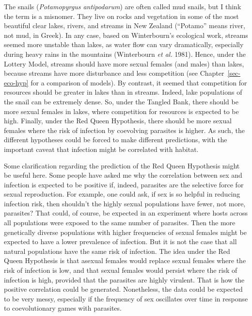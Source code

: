 \documentclass[
  letterpaper,
]{book}
\begin{document}
The snails (\emph{Potamopyrgus antipodarum}) are often called mud
snails, but I think the term is a misnomer. They live on rocks and
vegetation in some of the most beautiful clear lakes, rivers, and
streams in New Zealand (``Potamo'' means river, not mud, in Greek). In
any case, based on Winterbourn's ecological work, streams seemed more
unstable than lakes, as water flow can vary dramatically, especially
during heavy rains in the mountains (Winterbourn \emph{et al.} 1981).
Hence, under the Lottery Model, streams should have more sexual females
(and males) than lakes, because streams have more disturbance and less
competition (see Chapter~\ref{sec-eco-hyp} for a comparison of models).
By contrast, it seemed that competition for resources should be greater
in lakes than in streams. Indeed, lake populations of the snail can be
extremely dense. So, under the Tangled Bank, there should be more sexual
females in lakes, where competition for resources is expected to be
high. Finally, under the Red Queen Hypothesis, there should be more
sexual females where the risk of infection by coevolving parasites is
higher. As such, the different hypotheses could be forced to make
different predictions, with the important caveat that infection might be
correlated with habitat.

Some clarification regarding the prediction of the Red Queen Hypothesis
might be useful here. Some people have asked me why the correlation
between sex and infection is expected to be positive if, indeed,
parasites are the selective force for sexual reproduction. For example,
one could ask, if sex is so helpful in reducing infection risk, then
shouldn't the highly sexual populations have fewer, not more, parasites?
That could, of course, be expected in an experiment where hosts across
all populations were exposed to the same number of parasites. Then the
more genetically diverse populations with higher frequencies of sexual
females might be expected to have a lower prevalence of infection. But
it is not the case that all natural populations have the same risk of
infection. The idea under the Red Queen Hypothesis is that asexual
females would replace sexual females where the risk of infection is low,
and that sexual females would persist where the risk of infection is
high, provided that the parasites are highly virulent. That is how the
positive correlation could be generated. Nonetheless, the data could be
expected to be very messy, especially if the frequency of sex oscillates
over time in response to coevolutionary games with parasites.
\end{document}
